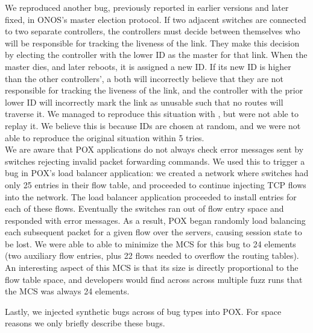  We reproduced another bug,
previously reported in earlier versions and later fixed, in
ONOS's master election protocol. If two adjacent switches are connected to two
separate controllers, the controllers must decide between themselves who will
be responsible for tracking the liveness of the link. They make this decision
by electing the controller with the lower ID as the master for that link.
When the master dies, and later reboots, it is assigned a new ID. If
its new ID is higher than the other controllers', a both will incorrectly
believe that they are not responsible for tracking the liveness of the link,
and the controller with the prior lower ID will incorrectly mark the link as
unusable such that no routes will traverse it. We managed to reproduce this situation with
\projectname, but were not able to replay it. We believe this is because IDs
are chosen at random, and we were not able to reproduce the original situation
within 5 tries.\\[0.5ex]
 We are aware that POX
applications do not always check error messages sent by switches
rejecting invalid packet forwarding commands. We used this to trigger a bug in
POX's load balancer application: we created a network where switches had only
25 entries in their flow table, and proceeded to continue injecting TCP flows
into the network. The load balancer application proceeded to install entries
for each of these flows. Eventually the switches ran out of flow entry
space and responded with error messages. As a result, POX began randomly load
balancing each subsequent packet for a given flow over the servers, causing
session state to be lost. We were able to able to minimize the MCS for this
bug to 24 elements (two auxiliary flow entries, plus 22 flows needed to
overflow the routing tables). An interesting aspect of this MCS is that its
size is directly proportional to the flow table space, and developers would
find across across multiple fuzz runs that the MCS was always 24
elements.

 Lastly, we injected synthetic bugs across of bug types into POX. For space
reasons we only briefly describe these bugs.


